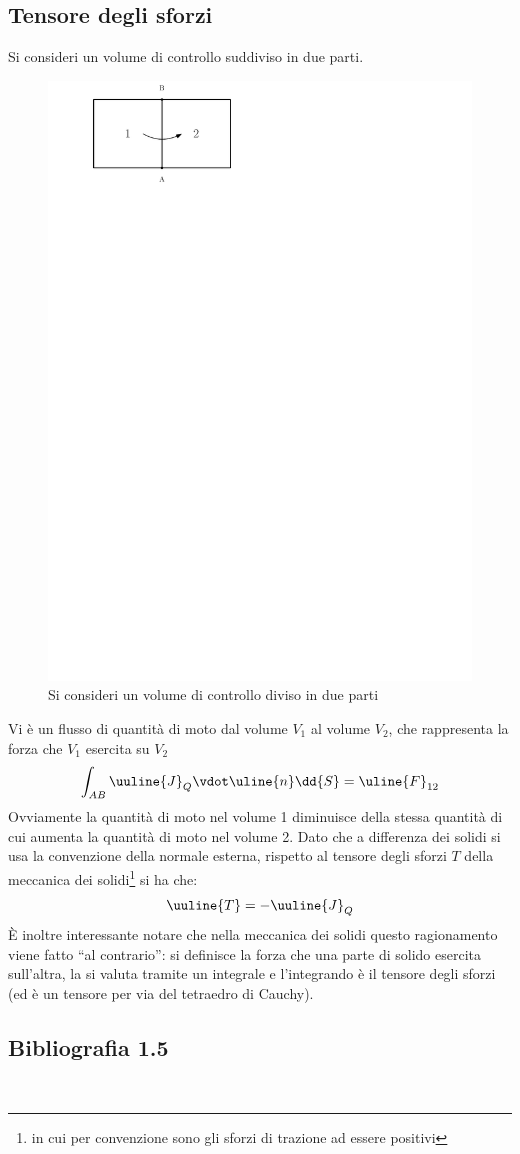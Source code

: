 \subsection{Tensore degli sforzi}
Si consideri un volume di controllo suddiviso in due parti.
%
	\begin{figure}[h]
		\includegraphics[scale=0.5]{./1.5 Forze e sforzi/1.5-2}
		\centering
		\caption{Si consideri un volume di controllo diviso in due parti}
	\end{figure}
%
Vi è un flusso di quantità di moto dal volume $V_1$ al volume $V_2$, che rappresenta la forza che $V_1$ esercita su $V_2$
	\begin{equation*}
		\int_{AB} \uuline{J}_Q \vdot \uline{n} \dd{S} = \uline{F}_{12}
	\end{equation*}
Ovviamente la quantità di moto nel volume 1 diminuisce della stessa quantità di cui aumenta la quantità di moto nel volume 2.
Dato che a differenza dei solidi si usa la convenzione della normale esterna, rispetto al tensore degli sforzi $T$ della meccanica dei solidi\footnote{in cui per convenzione sono gli sforzi di trazione ad essere positivi} si ha che:
	\begin{equation*}
		\uuline{T} = - \uuline{J}_Q 
	\end{equation*}
È inoltre interessante notare che nella meccanica dei solidi questo ragionamento viene fatto ``al contrario'': si definisce la forza che una parte di solido esercita sull'altra, la si valuta tramite un integrale e l'integrando è il tensore degli sforzi (ed è un tensore per via del tetraedro di Cauchy).
%
\subsection*{Bibliografia 1.5}
\cite[Cap.\ 1.6]{LuchiniQuadrio}\\
\cite[Cap.\ 2.6, 2.9, 2.13]{PnueliGutfinger}